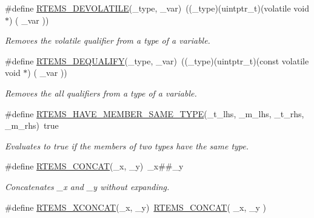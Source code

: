 \begin{DoxyCompactItemize}
\#define \mbox{\hyperlink{group__RTEMSScoreBaseDefs_gad705b083577fd95f634b2d55dca49b5e}{R\+T\+E\+M\+S\+\_\+\+D\+E\+V\+O\+L\+A\+T\+I\+LE}}(\+\_\+type,  \+\_\+var)~((\+\_\+type)(uintptr\+\_\+t)(volatile void $\ast$) ( \+\_\+var ))
\begin{DoxyCompactList}\small\item\em Removes the volatile qualifier from a type of a variable. \end{DoxyCompactList}\item 
\#define \mbox{\hyperlink{group__RTEMSScoreBaseDefs_gad814f9cc8a023ebcf4c93a3832f753cd}{R\+T\+E\+M\+S\+\_\+\+D\+E\+Q\+U\+A\+L\+I\+FY}}(\+\_\+type,  \+\_\+var)~((\+\_\+type)(uintptr\+\_\+t)(const volatile void $\ast$) ( \+\_\+var ))
\begin{DoxyCompactList}\small\item\em Removes the all qualifiers from a type of a variable. \end{DoxyCompactList}\item 
\#define \mbox{\hyperlink{group__RTEMSScoreBaseDefs_ga662d6f57a710150b48c8be4eb1fe9ff8}{R\+T\+E\+M\+S\+\_\+\+H\+A\+V\+E\+\_\+\+M\+E\+M\+B\+E\+R\+\_\+\+S\+A\+M\+E\+\_\+\+T\+Y\+PE}}(\+\_\+t\+\_\+lhs,  \+\_\+m\+\_\+lhs,  \+\_\+t\+\_\+rhs,  \+\_\+m\+\_\+rhs)~true
\begin{DoxyCompactList}\small\item\em Evaluates to true if the members of two types have the same type. \end{DoxyCompactList}\item 
\mbox{\label{group__RTEMSScoreBaseDefs_gabd32ed1152985be3c7ebbea1252b8ef3}} 
\#define \mbox{\hyperlink{group__RTEMSScoreBaseDefs_gabd32ed1152985be3c7ebbea1252b8ef3}{R\+T\+E\+M\+S\+\_\+\+C\+O\+N\+C\+AT}}(\+\_\+x,  \+\_\+y)~\+\_\+x\#\#\+\_\+y
\begin{DoxyCompactList}\small\item\em Concatenates \+\_\+x and \+\_\+y without expanding. \end{DoxyCompactList}\item 
\mbox{\label{group__RTEMSScoreBaseDefs_gaa474167f6277c99a269b3fc5decc5660}} 
\#define \mbox{\hyperlink{group__RTEMSScoreBaseDefs_gaa474167f6277c99a269b3fc5decc5660}{R\+T\+E\+M\+S\+\_\+\+X\+C\+O\+N\+C\+AT}}(\+\_\+x,  \+\_\+y)~\mbox{\hyperlink{group__RTEMSScoreBaseDefs_gabd32ed1152985be3c7ebbea1252b8ef3}{R\+T\+E\+M\+S\+\_\+\+C\+O\+N\+C\+AT}}( \+\_\+x, \+\_\+y )

\end{DoxyCompactItemize}
